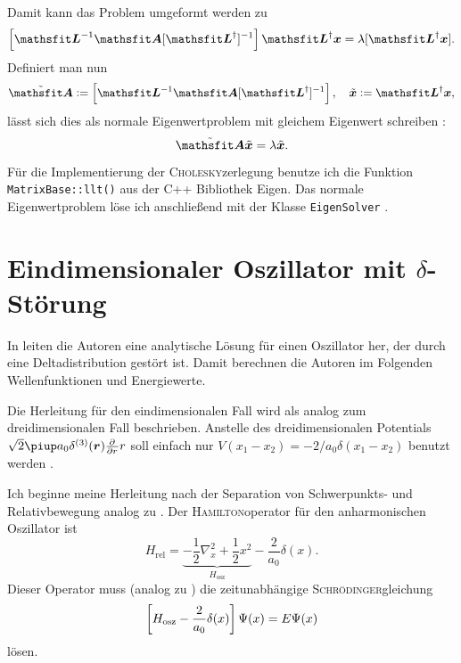Damit kann das Problem umgeformt werden zu \parencite[(3.31)]{MacKinnon/GEVP}
\[
    \sbr{\tens L^{-1} \tens A [\tens L^\dagger]^{-1}} \tens L^\dagger \vec x
    =
    \lambda [\tens L^\dagger \vec x].
\]
Definiert man nun
\[
    \tilde{\tens A} := \sbr{\tens L^{-1} \tens A [\tens L^\dagger]^{-1}}
    \eqnsep
    \tilde{\vec x} := \tens L^\dagger \vec x,
\]
lässt sich dies als normale Eigenwertproblem mit gleichem Eigenwert schreiben
\parencite[(3.32)]{MacKinnon/GEVP}:
\[
    \tilde{\tens A} \tilde{\vec x} = \lambda \tilde{\vec x}.
\]

Für die Implementierung der \textsc{Cholesky}zerlegung benutze ich die
Funktion \texttt{MatrixBase::llt()} \parencite{Eigen/LLT} aus der C++
Bibliothek Eigen. Das normale Eigenwertproblem löse ich anschließend mit der
Klasse \texttt{EigenSolver} \parencite{Eigen/EigenSolver}.

\section{Eindimensionaler Oszillator mit \texorpdfstring{$\delta$}{delta}-Störung}


\newcommand\br[1]{\parencite[(#1)]{Busch/Two_Cold}}

In  leiten die Autoren eine analytische Lösung für
einen Oszillator her, der durch eine Deltadistribution gestört ist. Damit
berechnen die Autoren im Folgenden Wellenfunktionen und Energiewerte.

Die Herleitung für den eindimensionalen Fall wird als analog zum
dreidimensionalen Fall beschrieben. Anstelle des dreidimensionalen Potentials
$\sqrt 2 \piup a_0 \delta^{(3)}(\vec r) \pd{}r r$ soll einfach nur $V(x_1 -
x_2) = - 2/a_0 \delta(x_1 - x_2)$ benutzt werden
\parencite[Fußnote~20]{Busch/Two_Cold}.

Ich beginne meine Herleitung nach der Separation von Schwerpunkts- und
Relativbewegung analog zu \br2. Der \textsc{Hamilton}operator für den
anharmonischen Oszillator ist
\[
    H_\text{rel} = \underbrace{- \frac12 \nabla_x^2 + \frac 12
    x^2}_{H_\text{osz}} - \frac2{a_0} \delta(x).
\]
Dieser Operator muss (analog zu \br3) die zeitunabhängige
\textsc{Schrödinger}gleichung
\begin{equation}
    \label{eq:Bus_3}
    \sbr{H_\text{osz} - \frac2{a_0} \delta(x)} \Psi(x) = E \Psi(x)
\end{equation}
lösen.

